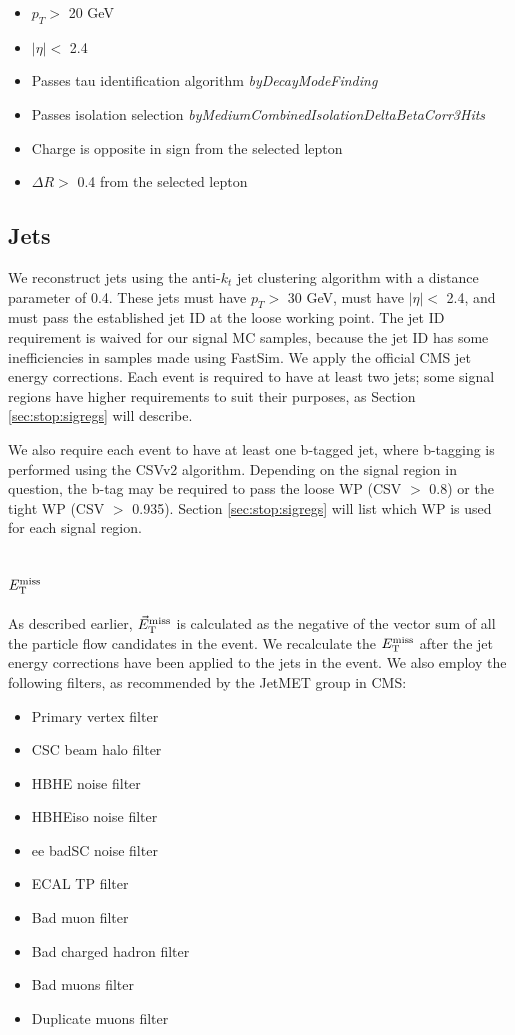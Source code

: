 \begin{itemize}
\item $p_T >$ 20 GeV
\item $|\eta| <$ 2.4
\item Passes tau identification algorithm \emph{byDecayModeFinding}
\item Passes isolation selection
  \emph{byMediumCombinedIsolationDeltaBetaCorr3Hits}
\item Charge is opposite in sign from the selected lepton
\item $\Delta R >$ 0.4 from the selected lepton
\end{itemize}

\subsection{Jets}
\label{ssec:stop:jets}

We reconstruct jets using the anti-$k_t$ jet clustering algorithm
\cite{antikt} with a distance parameter of 0.4. These jets must have
$p_T >$ 30 GeV, must have $|\eta| <$ 2.4, and must pass the
established jet ID at the loose working point. The jet ID requirement
is waived for our signal MC samples, because the jet ID has some
inefficiencies in samples made using FastSim. We apply the official
CMS jet energy corrections. Each event is required to have at least
two jets; some signal regions have higher requirements to
suit their purposes, as Section \ref{sec:stop:sigregs} will describe.

We also require each event to have at least one b-tagged jet, where
b-tagging is performed using the CSVv2 algorithm. Depending on the
signal region in question, the b-tag may be required to pass the loose
WP (CSV $>$ 0.8) or the tight WP (CSV $>$ 0.935). Section
\ref{sec:stop:sigregs} will list which WP is used for each signal region.

\subsection{\texorpdfstring{$E_\text{T}^\text{miss}$}{MET}}
\label{ssec:stop:met}

As described earlier, $\vec{E}_\text{T}^\text{miss}$ is calculated as the negative of the vector
sum of all the particle flow candidates in the event. We recalculate
the $E_\text{T}^\text{miss}$ after the jet energy corrections have been applied to the jets
in the event. We also employ the following filters, as recommended by
the JetMET group in CMS:

\begin{itemize}
\item Primary vertex filter
\item CSC beam halo filter
\item HBHE noise filter
\item HBHEiso noise filter
\item ee badSC noise filter
\item ECAL TP filter
\item Bad muon filter
\item Bad charged hadron filter
\item Bad muons filter
\item Duplicate muons filter
\end{itemize}

